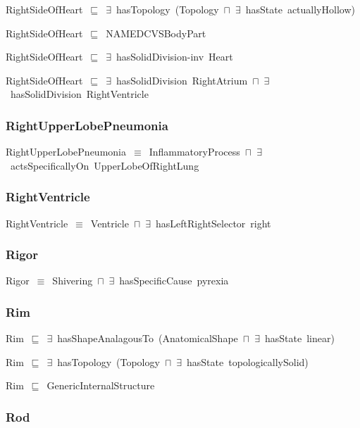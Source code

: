 \documentclass{article}
\begin{document}
RightSideOfHeart~\ensuremath{\sqsubseteq}~\ensuremath{\exists}~hasTopology~(Topology~\ensuremath{\sqcap}~\ensuremath{\exists}~hasState~actuallyHollow)~

RightSideOfHeart~\ensuremath{\sqsubseteq}~NAMEDCVSBodyPart~

RightSideOfHeart~\ensuremath{\sqsubseteq}~\ensuremath{\exists}~hasSolidDivision-inv~Heart~

RightSideOfHeart~\ensuremath{\sqsubseteq}~\ensuremath{\exists}~hasSolidDivision~RightAtrium~\ensuremath{\sqcap}~\ensuremath{\exists}~hasSolidDivision~RightVentricle~

\subsubsection*{RightUpperLobePneumonia}

RightUpperLobePneumonia~\ensuremath{\equiv}~InflammatoryProcess~\ensuremath{\sqcap}~\ensuremath{\exists}~actsSpecificallyOn~UpperLobeOfRightLung

\subsubsection*{RightVentricle}

RightVentricle~\ensuremath{\equiv}~Ventricle~\ensuremath{\sqcap}~\ensuremath{\exists}~hasLeftRightSelector~right

\subsubsection*{Rigor}

Rigor~\ensuremath{\equiv}~Shivering~\ensuremath{\sqcap}~\ensuremath{\exists}~hasSpecificCause~pyrexia

\subsubsection*{Rim}

Rim~\ensuremath{\sqsubseteq}~\ensuremath{\exists}~hasShapeAnalagousTo~(AnatomicalShape~\ensuremath{\sqcap}~\ensuremath{\exists}~hasState~linear)~

Rim~\ensuremath{\sqsubseteq}~\ensuremath{\exists}~hasTopology~(Topology~\ensuremath{\sqcap}~\ensuremath{\exists}~hasState~topologicallySolid)~

Rim~\ensuremath{\sqsubseteq}~GenericInternalStructure~

\subsubsection*{Rod}
\end{document}
